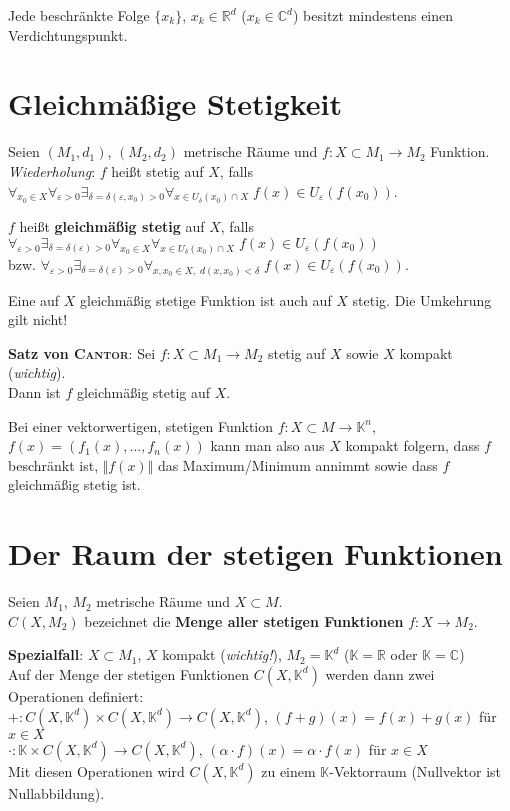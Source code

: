 Jede beschränkte Folge $\{x_k\}$, $x_k \in \mathbb{R}^d$
($x_k \in \mathbb{C}^d$) besitzt mindestens einen Verdichtungspunkt.

\section{%
    Gleichmäßige Stetigkeit%
}

Seien $(M_1,d_1)$, $(M_2,d_2)$ metrische Räume und
$f: X \subset M_1 \rightarrow M_2$ Funktion. \\
\emph{Wiederholung}: $f$ heißt stetig auf $X$, falls
$\forall_{x_0 \in X} \forall_{\varepsilon > 0}
\exists_{\delta = \delta(\varepsilon, x_0) > 0}
\forall_{x \in U_\delta(x_0) \cap X}\; f(x) \in U_\varepsilon(f(x_0))$.

$f$ heißt \textbf{gleichmäßig stetig} auf $X$, falls
$\forall_{\varepsilon > 0} \exists_{\delta = \delta(\varepsilon) > 0}
\forall_{x_0 \in X} \forall_{x \in U_\delta(x_0) \cap X}\;
f(x) \in U_\varepsilon(f(x_0))$ \\
bzw. $\forall_{\varepsilon > 0} \exists_{\delta = \delta(\varepsilon) > 0}
\forall_{x, x_0 \in X,\; d(x, x_0) < \delta}\;
f(x) \in U_\varepsilon(f(x_0))$.

Eine auf $X$ gleichmäßig stetige Funktion ist auch auf $X$ stetig.
Die Umkehrung gilt nicht!

\textbf{Satz von \textsc{Cantor}}: Sei $f: X \subset M_1 \rightarrow M_2$
stetig auf $X$ sowie $X$ kompakt (\emph{wichtig}). \\
Dann ist $f$ gleichmäßig stetig auf $X$.

Bei einer vektorwertigen, stetigen Funktion
$f: X \subset M \rightarrow \mathbb{K}^n$, $f(x) = (f_1(x), \ldots, f_n(x))$
kann man also aus $X$ kompakt folgern, dass
$f$ beschränkt ist, $\Vert f(x) \Vert$ das Maximum/Minimum annimmt
sowie dass $f$ gleichmäßig stetig ist.

\pagebreak

\section{%
    Der Raum der stetigen Funktionen%
}

Seien $M_1$, $M_2$ metrische Räume und $X \subset M$. \\
$C(X, M_2)$ bezeichnet die \textbf{Menge aller stetigen Funktionen}
$f: X \rightarrow M_2$.

\linie

\textbf{Spezialfall}: $X \subset M_1$, $X$ kompakt (\emph{wichtig!}),
$M_2 = \mathbb{K}^d$
($\mathbb{K} = \mathbb{R}$ oder $\mathbb{K} = \mathbb{C}$) \\
Auf der Menge der stetigen Funktionen $C(X, \mathbb{K}^d)$ werden dann zwei
Operationen definiert: \\
$\boldsymbol{+}: C(X, \mathbb{K}^d) \times C(X, \mathbb{K}^d) \rightarrow
C(X, \mathbb{K}^d)$, $(f + g)(x) = f(x) + g(x)$ für $x \in X$ \\
$\boldsymbol{\cdot}: \mathbb{K} \times C(X, \mathbb{K}^d) \rightarrow
C(X, \mathbb{K}^d)$, $(\alpha \cdot f)(x) = \alpha \cdot f(x)$ für $x \in X$ \\
Mit diesen Operationen wird $C(X, \mathbb{K}^d)$ zu einem
$\mathbb{K}$-Vektorraum (Nullvektor ist Nullabbildung).

